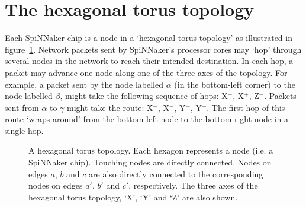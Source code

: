	
	\section{The hexagonal torus topology}
		
		Each SpiNNaker chip is a node in a `hexagonal torus topology' as
		illustrated in figure~\ref{fig:hexagonalTorusTopology}. Network packets
		sent by SpiNNaker's processor cores may `hop' through several nodes in the
		network to reach their intended destination. In each hop, a packet may
		advance one node along one of the three axes of the topology. For example,
		a packet sent by the node labelled $\alpha$ (in the bottom-left corner) to
		the node labelled $\beta$, might take the following sequence of hops:
		X$^+$, X$^+$, Z$^-$. Packets sent from $\alpha$ to $\gamma$ might take the
		route: X$^-$, X$^-$, Y$^+$, Y$^+$. The first hop of this route `wraps
		around' from the bottom-left node to the bottom-right node in a single hop.
		
		\begin{figure}
			\center
			
			\caption[A hexagonal torus topology.]%
			{A hexagonal torus topology. Each hexagon represents a node (i.e.
			a SpiNNaker chip). Touching nodes are directly connected. Nodes on edges
			$a$, $b$ and $c$ are also directly connected to the corresponding nodes
			on edges $a'$, $b'$ and $c'$, respectively. The three axes of the
			hexagonal torus topology, `X', `Y' and `Z' are also shown.}
			\label{fig:hexagonalTorusTopology}
		\end{figure}
		
